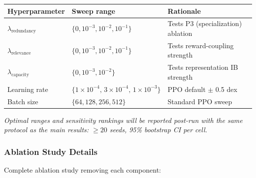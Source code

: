 \documentclass[10pt, letterpaper]{article}
\begin{document}
\begin{center}
\begin{tabular}{lll}
\toprule
\textbf{Hyperparameter} & \textbf{Sweep range} & \textbf{Rationale} \\
\midrule
$\lambda_{\text{redundancy}}$ & $\{0,10^{-3},10^{-2},10^{-1}\}$ & Tests P3 (specialization) ablation \\
$\lambda_{\text{relevance}}$ & $\{0,10^{-3},10^{-2},10^{-1}\}$ & Tests reward-coupling strength \\
$\lambda_{\text{capacity}}$ & $\{0, 10^{-3}, 10^{-2}\}$ & Tests representation IB strength \\
Learning rate & $\{1\!\times\!10^{-4},\, 3\!\times\!10^{-4},\, 1\!\times\!10^{-3}\}$ & PPO default $\pm$ 0.5 dex \\
Batch size & $\{64,128,256,512\}$ & Standard PPO sweep \\
\bottomrule
\end{tabular}
\end{center}
\emph{Optimal ranges and sensitivity rankings will be reported post-run with the same protocol as the main results: $\geq 20$ seeds, 95\% bootstrap CI per cell.}

\subsubsection{Ablation Study Details}

Complete ablation study removing each component:
\end{document}
